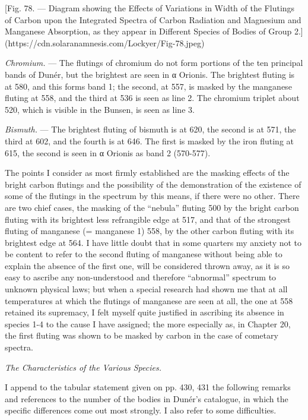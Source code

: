 \documentclass[a4paper, 12pt, oneside, polutonikogreek, english]{article}
\begin{document}
[Fig. 78. --- Diagram showing the Effects of Variations in Width of the Flutings of Carbon upon the Integrated Spectra of Carbon Radiation and Magnesium and Manganese Absorption, as they appear in Different Species of Bodies of Group 2.](https://cdn.solaranamnesis.com/Lockyer/Fig-78.jpeg)

\emph{Chromium.} --- The flutings of chromium do not form portions of the ten principal bands of Dunér, but the brightest are seen in α Orionis. The brightest fluting is at 580, and this forms band 1; the second, at 557, is masked by the manganese fluting at 558, and the third at 536 is seen as line 2. The chromium triplet about 520, which is visible in the Bunsen, is seen as line 3.

\emph{Bismuth.} --- The brightest fluting of bismuth is at 620, the second is at 571, the third at 602, and the fourth is at 646. The first is masked by the iron fluting at 615, the second is seen in α Orionis as band 2 (570-577).

The points I consider as most firmly established are the masking effects of the bright carbon flutings and the possibility of the demonstration of the existence of some of the flutings in the spectrum by this means, if there were no other. There are two chief cases, the masking of the ``nebula'' fluting 500 by the bright carbon fluting with its brightest less refrangible edge at 517, and that of the strongest fluting of manganese (= manganese 1) 558, by the other carbon fluting with its brightest edge at 564. I have little doubt that in some quarters my anxiety not to be content to refer to the second fluting of manganese without being able to explain the absence of the first one, will be considered thrown away, as it is so easy to ascribe any non-understood and therefore ``abnormal'' spectrum to unknown physical laws; but when a special research had shown me that at all temperatures at which the flutings of manganese are seen at all, the one at 558 retained its supremacy, I felt myself quite justified in ascribing its absence in species 1-4 to the cause I have assigned; the more especially as, in Chapter 20, the first fluting was shown to be masked by carbon in the case of cometary spectra.

\emph{The Characteristics of the Various Species.}

I append to the tabular statement given on pp. 430, 431 the following remarks and references to the number of the bodies in Dunér's catalogue, in which the specific differences come out most strongly. I also refer to some difficulties.
\end{document}
